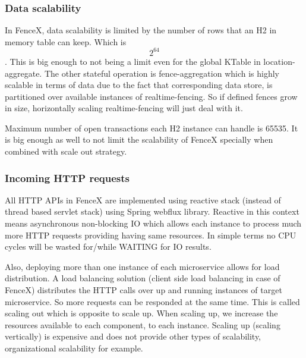 \documentclass[a4]{report}
\begin{document}
    \subsubsection{Data scalability}
    In FenceX, data scalability is limited by the number of rows that an H2\cite{h2} in memory table can keep.
    Which is \[ 2^64 \].
    This is big enough to not being a limit even for the global KTable in location-aggregate.
    The other stateful operation is fence-aggregation which is highly scalable in terms of data due to the
    fact that corresponding data store, is partitioned over available instances of realtime-fencing.
    So if defined fences grow in size, horizontally scaling realtime-fencing will just deal with it.

    Maximum number of open transactions each H2 instance can handle is 65535.
    It is big enough as well to not limit the scalability of FenceX specially when combined with scale out strategy.

    \subsubsection{Incoming HTTP requests}
    All HTTP APIs in FenceX are implemented using reactive stack (instead of thread based servlet stack) using Spring
    webflux library.
    Reactive in this context means asynchronous non-blocking IO which allows each instance to process much more HTTP
    requests providing having same resources.
    In simple terms no CPU cycles will be wasted for/while WAITING for IO results.

    Also, deploying more than one instance of each microservice allows for load distribution.
    A load balancing solution (client side load balancing in case of FenceX) distributes the HTTP calls over up and
    running instances of target microservice.
    So more requests can be responded at the same time.
    This is called scaling out which is opposite to scale up.
    When scaling up, we increase the resources available to each component, to each instance.
    Scaling up (scaling vertically) is expensive and does not provide other types of scalability, organizational
    scalability for example.
\end{document}
